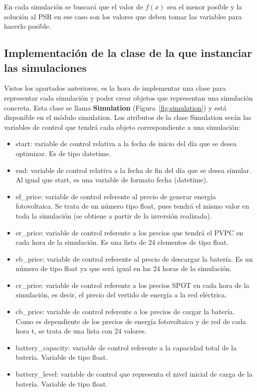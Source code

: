 En cada simulación se buscará que el valor de $ f(x) $ sea el menor posible y la solución al PSR en ese caso son los valores que deben tomar las variables para hacerlo posible.

\subsection{Implementación de la clase de la que instanciar las simulaciones}
Vistos los apartados anteriores, es la hora de implementar una clase para representar cada simulación y poder crear objetos que representan una simulación concreta. Esta clase se llama \textbf{Simulation} (Figura~\ref{fig:simulation}) y está disponible en el módulo simulation. Los atributos de la clase Simulation serán las variables de control que tendrá cada objeto correspondiente a una simulación:
\begin{itemize}
        \item start: variable de control relativa a la fecha de inicio del día que se desea optimizar. Es de tipo datetime.
        \item end: variable de control relativa a la fecha de fin del día que se desea simular. Al igual que start, es una variable de formato fecha (datetime).
        \item ef\_price: variable de control referente al precio de generar energía fotovoltaica. Se trata de un número tipo float, pues tendrá el mismo valor en toda la simulación (se obtiene a partir de la inversión realizada).
        \item er\_price: variable de control referente a los precios que tendrá el \gls{PVPC} en cada hora de la simulación. Es una lista de 24 elementos de tipo float.
        \item eb\_price: variable de control referente al precio de descargar la batería. Es un número de tipo float ya que será igual en las 24 horas de la simulación.
        \item cr\_price: variable de control referente a los precios SPOT en cada hora de la simulación, es decir, el precio del vertido de energía a la red eléctrica.
        \item cb\_price: variable de control referente a los precios de cargar la batería. Como es dependiente de los precios de energía fotovoltaica y de red de cada hora t, se trata de una lista con 24 valores.
        \item battery\_capacity: variable de control referente a la capacidad total de la batería. Variable de tipo float.
        \item battery\_level: variable de control que representa el nivel inicial de carga de la batería. Variable de tipo float.

\end{itemize}
